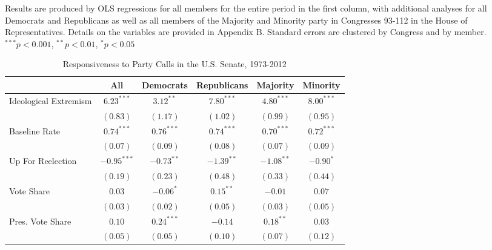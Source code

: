 \documentclass[12pt]{article}
\begin{document}
\begin{table}[H]
\begin{threeparttable}
\begin{tablenotes}
   \item
   Results are produced by OLS regressions for all members for the entire period in the first column, with additional analyses for all Democrats and Republicans as well as all members of the Majority and Minority party in Congresses 93-112 in the House of Representatives. Details on the variables are provided in Appendix B.
   Standard errors are clustered by Congress and by member.
$^{***}p<0.001$, $^{**}p<0.01$, $^*p<0.05$
 \end{tablenotes}
\end{threeparttable}
\end{table}

\begin{table}[H]
\centering
\begin{threeparttable}
\singlespacing
\small
\caption{Responsiveness to Party Calls in the U.S. Senate, 1973-2012}
\label{tab-senate-models}
\small
\begin{tabular}{l c c c c c }
\hline
& All & Democrats & Republicans & Majority & Minority \\
\hline
Ideological Extremism & $6.23^{***}$  & $3.12^{**}$  & $7.80^{***}$   & $4.80^{***}$ & $8.00^{***}$ \\
                      & $(0.83)$      & $(1.17)$     & $(1.02)$       & $(0.99)$     & $(0.95)$     \\
Baseline Rate         & $0.74^{***}$  & $0.76^{***}$ & $0.74^{***}$   & $0.70^{***}$ & $0.72^{***}$ \\
                      & $(0.07)$      & $(0.09)$     & $(0.08)$       & $(0.07)$     & $(0.09)$     \\
Up For Reelection     & $-0.95^{***}$ & $-0.73^{**}$ & $-1.39^{**}$   & $-1.08^{**}$ & $-0.90^{*}$  \\
                      & $(0.19)$      & $(0.23)$     & $(0.48)$       & $(0.33)$     & $(0.44)$     \\
Vote Share            & $0.03$        & $-0.06^{*}$  & $0.15^{**}$    & $-0.01$      & $0.07$       \\
                      & $(0.03)$      & $(0.02)$     & $(0.05)$       & $(0.03)$     & $(0.05)$     \\
Pres. Vote Share      & $0.10$        & $0.24^{***}$ & $-0.14$        & $0.18^{**}$  & $0.03$       \\
                      & $(0.05)$      & $(0.05)$     & $(0.10)$       & $(0.07)$     & $(0.12)$     \\

\end{tabular}
\end{threeparttable}
\end{table}
\end{document}
